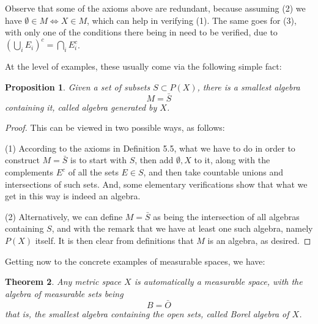 \documentclass[12pt]{amsbook}
\newtheorem{theorem}{Theorem}[chapter]
\newtheorem{proposition}[theorem]{Proposition}
\begin{document}
Observe that some of the axioms above are redundant, because assuming (2) we have $\emptyset\in M\iff X\in M$, which can help in verifying (1). The same goes for (3), with only one of the conditions there being in need to be verified, due to $\left(\bigcup_iE_i\right)^c=\bigcap_iE_i^c$.

\bigskip

At the level of examples, these usually come via the following simple fact:

\begin{proposition}
Given a set of subsets $S\subset P(X)$, there is a smallest algebra
$$M=\bar{S}$$
containing it, called algebra generated by $X$.
\end{proposition}

\begin{proof}
This can be viewed in two possible ways, as follows:

\medskip

(1) According to the axioms in Definition 5.5, what we have to do in order to construct $M=\bar{S}$ is to start with $S$, then add $\emptyset,X$ to it, along with the complements $E^c$ of all the sets $E\in S$, and then take countable unions and intersections of such sets. And, some elementary verifications show that what we get in this way is indeed an algebra.

\medskip

(2) Alternatively, we can define $M=\bar{S}$ as being the intersection of all algebras containing $S$, and with the remark that we have at least one such algebra, namely $P(X)$ itself. It is then clear from definitions that $M$ is an algebra, as desired.
\end{proof}

Getting now to the concrete examples of measurable spaces, we have:


\begin{theorem}
Any metric space $X$ is automatically a measurable space, with the algebra of measurable sets being 
$$B=\bar{O}$$
that is, the smallest algebra containing the open sets, called Borel algebra of $X$.
\end{theorem}
\end{document}
